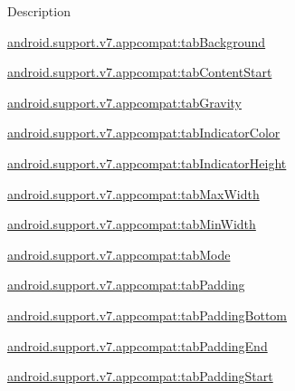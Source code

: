 Description 

{\ttfamily \hyperlink{classandroid_1_1support_1_1v7_1_1appcompat_1_1R_1_1styleable_ae47f32276712afa05b06431da195e5bb}{android.\+support.\+v7.\+appcompat\+:tab\+Background}}

{\ttfamily \hyperlink{classandroid_1_1support_1_1v7_1_1appcompat_1_1R_1_1styleable_ac351b0e0ca156fa1d4e6ed647ade8ac6}{android.\+support.\+v7.\+appcompat\+:tab\+Content\+Start}}

{\ttfamily \hyperlink{classandroid_1_1support_1_1v7_1_1appcompat_1_1R_1_1styleable_aabd9dc95552ef0c47cbf137217540f2e}{android.\+support.\+v7.\+appcompat\+:tab\+Gravity}}

{\ttfamily \hyperlink{classandroid_1_1support_1_1v7_1_1appcompat_1_1R_1_1styleable_a8c08dea36fe43fa447fca13e8dbb0fb8}{android.\+support.\+v7.\+appcompat\+:tab\+Indicator\+Color}}

{\ttfamily \hyperlink{classandroid_1_1support_1_1v7_1_1appcompat_1_1R_1_1styleable_a2170d61ffaf8518ee80c93d8af20f026}{android.\+support.\+v7.\+appcompat\+:tab\+Indicator\+Height}}

{\ttfamily \hyperlink{classandroid_1_1support_1_1v7_1_1appcompat_1_1R_1_1styleable_aa2ea2744277660540a1c51be56abcd62}{android.\+support.\+v7.\+appcompat\+:tab\+Max\+Width}}

{\ttfamily \hyperlink{classandroid_1_1support_1_1v7_1_1appcompat_1_1R_1_1styleable_a5b1f2d52d72419e4e3a54aaae5581f99}{android.\+support.\+v7.\+appcompat\+:tab\+Min\+Width}}

{\ttfamily \hyperlink{classandroid_1_1support_1_1v7_1_1appcompat_1_1R_1_1styleable_a33c64cec340e2fdc2aa5d7139637c920}{android.\+support.\+v7.\+appcompat\+:tab\+Mode}}

{\ttfamily \hyperlink{classandroid_1_1support_1_1v7_1_1appcompat_1_1R_1_1styleable_a97f140ed7f4cb71b4c00309d063b2aa7}{android.\+support.\+v7.\+appcompat\+:tab\+Padding}}

{\ttfamily \hyperlink{classandroid_1_1support_1_1v7_1_1appcompat_1_1R_1_1styleable_acff2ca0891fae17b26046ac2678216ac}{android.\+support.\+v7.\+appcompat\+:tab\+Padding\+Bottom}}

{\ttfamily \hyperlink{classandroid_1_1support_1_1v7_1_1appcompat_1_1R_1_1styleable_a82bcf12542227711510855ac622ef61d}{android.\+support.\+v7.\+appcompat\+:tab\+Padding\+End}}

{\ttfamily \hyperlink{classandroid_1_1support_1_1v7_1_1appcompat_1_1R_1_1styleable_a4035abeaff701951ad7db51385d68554}{android.\+support.\+v7.\+appcompat\+:tab\+Padding\+Start}}

